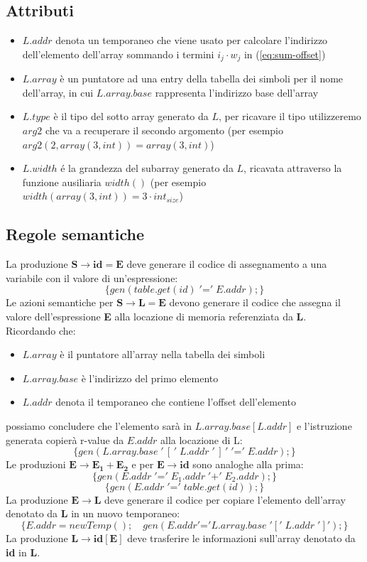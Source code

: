 \documentclass[11pt]{article}
\begin{document}
\subsection{Attributi}
\begin{itemize}
  \item $L.addr$ denota un temporaneo che viene usato per calcolare l'indirizzo
  dell'elemento dell'array sommando i termini $i_j \cdot w_j$ in (\ref{eq:sum-offset})
  \item $L.array$ è un puntatore ad una entry della tabella dei simboli per il
  nome dell'array, in cui $L.array.base$ rappresenta l'indirizzo base dell'array
  \item $L.type$ è il tipo del sotto array generato da $L$, per ricavare il tipo
  utilizzeremo $arg2$ che va a recuperare il secondo argomento (per esempio 
  $arg2(2, array(3, int))=array(3, int)$)
  \item $L.width$ é la grandezza del subarray generato da $L$, ricavata attraverso 
  la funzione ausiliaria $width()$ (per esempio $width(array(3, int)) = 3 \cdot int_{size}$) 
\end{itemize}
\subsection{Regole semantiche}
La produzione $\mathbf{S \rightarrow id = E}$ deve generare il codice di assegnamento a 
una variabile con il valore di un'espressione: 
$$\{gen(table.get(id) \;'\mathord{=}'\; E.addr);\}$$
Le azioni semantiche per $\mathbf{S \rightarrow L=E}$ devono generare il codice che assegna
il valore dell'espressione \textbf{E} alla locazione di memoria referenziata da \textbf{L}. 
\\Ricordando che: 
\begin{itemize}
  \item $L.array$ è il puntatore all'array nella tabella dei simboli
  \item $L.array.base$ è l'indirizzo del primo elemento
  \item $L.addr$ denota il temporaneo che contiene l'offset dell'elemento
\end{itemize}
possiamo concludere che l'elemento sarà in $L.array.base[L.addr]$ e l'istruzione generata 
copierà r-value da $E.addr$ alla locazione di L:
$$\{gen(L.array.base\;'\,[\,'\;L.addr\;'\,]\,'\;'\mathord{=}'\; E.addr);\}$$
Le produzioni $\mathbf{E\rightarrow E_1+E_2}$ e per $\mathbf{E\rightarrow id}$ sono analoghe 
alla prima:
$$\{gen(E.addr \;'\mathord{=}'\; E_1.addr \;'\mathord{+}'\; E_2.addr );\}$$
$$\{gen(E.addr \;'\mathord{=}'\; table.get(id) );\}$$
La produzione $\mathbf{E\rightarrow L}$ deve generare il codice per copiare l'elemento dell'array 
denotato da \textbf{L} in un nuovo temporaneo:
$$\{E.addr = newTemp();\quad gen(E.addr '\mathord{=}' L.array.base\;'['\;L.addr\;']');\}$$
La produzione $\mathbf{L \rightarrow id[E]}$ deve trasferire le informazioni sull'array denotato 
da \textbf{id} in \textbf{L}.
\end{document}
